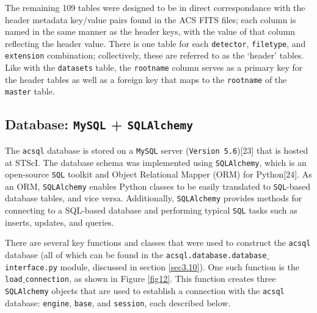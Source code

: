 \documentclass[10pt,journal,compsoc]{IEEEtran}
\begin{document}
The remaining 109 tables were designed to be in direct correspondance with the header metadata key/value pairs found in the ACS FITS files; each column is named in the same manner as
the header keys, with the value of that column reflecting the header value. There is one table for each \texttt{detector}, \texttt{filetype}, and \texttt{extension} combination;
collectively, these are referred to as the `header' tables.  Like with the \texttt{datasets} table, the \texttt{rootname} column serves as a primary key for the header tables as well
as a foreign key that maps to the \texttt{rootname} of the \texttt{master} table.


\subsection{Database: \texttt{MySQL} + \texttt{SQLAlchemy}} \label{sec3.6}

The \texttt{acsql} database is stored on a \texttt{MySQL} server (\texttt{Version 5.6})[23] that is hosted at STScI.  The database schema was implemented using \texttt{SQLAlchemy}, which
is an open-source \texttt{SQL} toolkit and Object Relational Mapper (ORM) for Python[24].  As an ORM, \texttt{SQLAlchemy} enables Python classes to be easily translated to
\texttt{SQL}-based database tables, and vice versa.  Additionally, \texttt{SQLAlchemy} provides methods for connecting to a SQL-based database and performing typical \texttt{SQL}
tasks such as inserts, updates, and queries.

There are several key functions and classes that were used to construct the \texttt{acsql} database (all of which can be found in the \texttt{acsql.database.database$\_$interface.py}
module, discussed in section \ref{sec3.10}). One such function is the \texttt{load$\_$connection}, as shown in Figure \ref{fig12}.  This function creates three \texttt{SQLAlchemy}
objects that are used to establish a connection with the \texttt{acsql} database: \texttt{engine}, \texttt{base}, and \texttt{session}, each described below.
\end{document}
